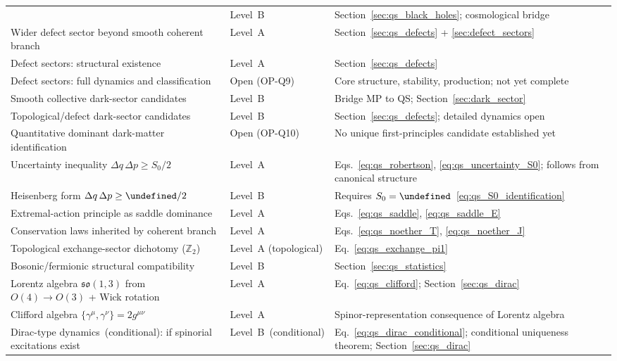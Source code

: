 \documentclass[11pt,a4paper]{article}
\let\hbar\undefined
\numberwithin{equation}{section}
\begin{document}
{\begin{longtable}{p{6.0cm}p{2.4cm}p{4.5cm}}
  & Level~B
  & Section~\ref{sec:qs_black_holes}; cosmological bridge \\
Wider defect sector beyond smooth coherent branch
  & Level~A
  & Section~\ref{sec:qs_defects} + \ref{sec:defect_sectors} \\
Defect sectors: structural existence
  & Level~A
  & Section~\ref{sec:qs_defects} \\
Defect sectors: full dynamics and classification
  & Open (OP-Q9)
  & Core structure, stability, production; not yet complete \\
Smooth collective dark-sector candidates
  & Level~B
  & Bridge MP to QS; Section~\ref{sec:dark_sector} \\
Topological/defect dark-sector candidates
  & Level~B
  & Section~\ref{sec:qs_defects}; detailed dynamics open \\
Quantitative dominant dark-matter identification
  & Open (OP-Q10)
  & No unique first-principles candidate established yet \\
Uncertainty inequality $\Delta q\,\Delta p\ge S_0/2$
  & Level~A
  & Eqs.~\eqref{eq:qs_robertson}, \eqref{eq:qs_uncertainty_S0};
    follows from canonical structure \\
Heisenberg form $\Delta q\,\Delta p\ge\hbar/2$
  & Level~B
  & Requires $S_0=\hbar$~\eqref{eq:qs_S0_identification} \\
Extremal-action principle as saddle dominance
  & Level~A
  & Eqs.~\eqref{eq:qs_saddle}, \eqref{eq:qs_saddle_E} \\
Conservation laws inherited by coherent branch
  & Level~A
  & Eqs.~\eqref{eq:qs_noether_T}, \eqref{eq:qs_noether_J} \\
Topological exchange-sector dichotomy ($\mathbb{Z}_2$)
  & Level~A (topological)
  & Eq.~\eqref{eq:qs_exchange_pi1} \\
Bosonic/fermionic structural compatibility
  & Level~B
  & Section~\ref{sec:qs_statistics} \\
Lorentz algebra $\mathfrak{so}(1,3)$ from $O(4)\to O(3)$ + Wick rotation
  & Level~A
  & Eq.~\eqref{eq:qs_clifford}; Section~\ref{sec:qs_dirac} \\
Clifford algebra $\{\gamma^\mu,\gamma^\nu\}=2g^{\mu\nu}$
  & Level~A
  & Spinor-representation consequence of Lorentz algebra \\
Dirac-type dynamics~(conditional): if spinorial excitations exist
  & Level~B~(conditional)
  & Eq.~\eqref{eq:qs_dirac_conditional};
    conditional uniqueness theorem; Section~\ref{sec:qs_dirac} \\

\end{longtable}}
\end{document}
